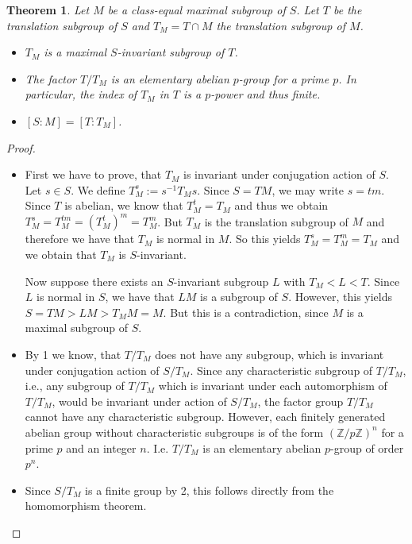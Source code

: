 \documentclass[12pt]{amsart}
\newcommand{\Z}{{\mathbb Z}}
\newtheorem{theorem}{Theorem}[section]
\begin{document}
\begin{theorem}
\label{tpind}
Let $M$ be a class-equal maximal subgroup of $S$. Let $T$ be the
translation subgroup of $S$ and $T_M = T \cap M$ the translation 
subgroup of $M$. 
\begin{itemize}
\item[1.]
$T_M$ is a maximal $S$-invariant subgroup of $T$.
\item[2.]
The factor $T / T_M$ is an elementary abelian $p$-group for a prime $p$. 
In particular, the index of $T_M$ in $T$ is a $p$-power and thus finite. 
\item[3.]
$[S : M] = [T : T_M]$.

\end{itemize}
\end{theorem}

\begin{proof}
\begin{itemize}
\item[1.]
First we have to prove, that $T_M$ is invariant under conjugation
action of $S$. Let $s \in S$. We define $T_M^s := s^{-1} T_M s$. 
Since $S = T M$, we may write $s = t m$.
Since $T$ is abelian, we know that $T_M^t = T_M$ and thus we obtain 
$T_M^s = T_M^{tm} = (T_M^t)^m = T_M^m$. But $T_M$ is the translation
subgroup of $M$ and therefore we have that $T_M$ is normal in $M$.
So this yields $T_M^s = T_M^m = T_M$ and we obtain that $T_M$ is
$S$-invariant.

Now suppose there exists an $S$-invariant subgroup $L$ with
$T_M < L < T$. Since $L$ is normal in $S$, we have that $L M$
is a subgroup of $S$. However, this yields $S = T M > L M > T_M M = M$.
But this is a contradiction, since $M$ is a maximal subgroup of $S$.

\item[2.]
By 1 we know, that $T / T_M$ does not have any subgroup, which
is invariant under conjugation action of $S / T_M$. Since any
characteristic subgroup of $T / T_M$, i.e., any subgroup of $T / T_M$ which
is invariant under each automorphism of $T / T_M$, would be invariant under
action of $S / T_M$, the factor group $T / T_M$ cannot have any
characteristic subgroup. However, each finitely generated abelian
group without characteristic subgroups is of the form $(\Z / p \Z)^n$
for a prime $p$ and an integer $n$. I.e. $T / T_M$ is an
elementary abelian $p$-group of order $p^n$.

\item[3.]
Since $S / T_M$ is a finite group by 2, this follows directly 
from the homomorphism theorem.
\end{itemize}
\end{proof}
\end{document}
